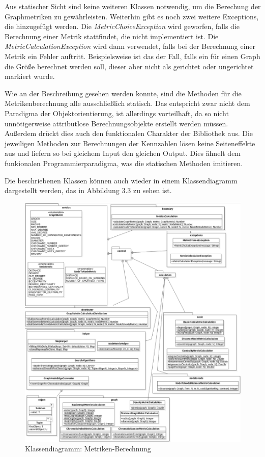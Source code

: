 \documentclass[a4paper,12pt,ngerman,chapterprefix=false,listof=totoc,bibliography=totoc]{scrreprt}
\begin{document}
{{{Aus statischer Sicht sind keine weiteren Klassen notwendig, um die Berechung der Graphmetriken zu gewährleisten. Weiterhin gibt es noch zwei weitere Exceptions, die hinzugefügt werden. Die \textit{MetricChoiceException} wird geworfen, falls die Berechnung einer Metrik stattfindet, die nicht implementiert ist. Die \textit{MetricCalculationException} wird dann verwendet, falls bei der Berechnung einer Metrik ein Fehler auftritt. Beispielsweise ist das der Fall, falls ein für einen Graph die Größe berechnet werden soll, dieser aber nicht als gerichtet oder ungerichtet markiert wurde.

Wie an der Beschreibung gesehen werden konnte, sind die Methoden für die Metrikenberechnung alle ausschließlich statisch. Das entspricht zwar nicht dem Paradigma der Objektorientierung, ist allerdings vorteilhaft, da so nicht unnötigerweise attributlose Berechnungsobjekte erstellt werden müssen. Außerdem drückt dies auch den funktionalen Charakter der Bibliothek aus. Die jeweiligen Methoden zur Berechnungen der Kennzahlen lösen keine Seiteneffekte aus und liefern so bei gleichem Input den gleichen Output. Dies ähnelt dem funkionalen Programmierparadigma, was die statischen Methoden imitieren. \cite{chiusano_functional_2015}

Die beschriebenen Klassen können auch wieder in einem Klassendiagramm dargestellt werden, das in Abbildung 3.3 zu sehen ist.
\begin{figure}[htp]
	\centering
	\includegraphics[scale=.38]{Abbildungen/UML/metrics_class_diagram.png}
	\caption[Klassendiagramm: Metriken-Berechnung]{Klassendiagramm: Metriken-Berechnung}
\end{figure}
}
}}
\end{document}
